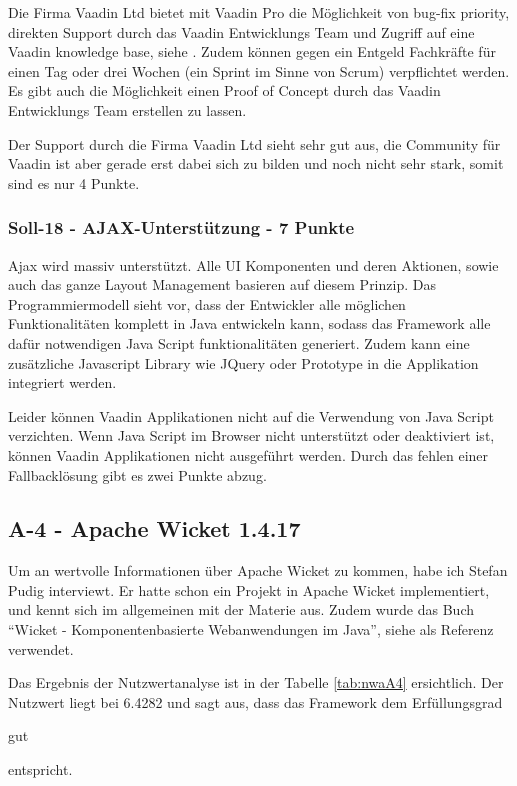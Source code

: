   Die Firma Vaadin Ltd bietet mit Vaadin Pro die Möglichkeit von bug-fix
  priority, direkten Support durch das Vaadin Entwicklungs Team und Zugriff auf
  eine Vaadin knowledge base, siehe \cite{VaadinPro}. Zudem können gegen ein
  Entgeld Fachkräfte für einen Tag oder drei Wochen (ein Sprint im Sinne von
  Scrum) verpflichtet werden. Es gibt auch die Möglichkeit einen Proof of
  Concept durch das Vaadin Entwicklungs Team erstellen zu lassen.
  
  Der Support durch die Firma Vaadin Ltd sieht sehr gut aus, die Community für
  Vaadin ist aber gerade erst dabei sich zu bilden und noch nicht sehr stark, somit
  sind es nur 4 Punkte.

  \subsubsection{Soll-18 - AJAX-Unterstützung - 7 Punkte}
  
  \ac{Ajax} wird massiv unterstützt. Alle \ac{UI} Komponenten und deren
  Aktionen, sowie auch das ganze Layout Management basieren auf diesem Prinzip.
  Das Programmiermodell sieht vor, dass der Entwickler alle möglichen
  Funktionalitäten komplett in Java entwickeln kann, sodass das Framework alle
  dafür notwendigen Java Script funktionalitäten generiert. Zudem kann eine
  zusätzliche Javascript Library wie JQuery oder Prototype in die Applikation
  integriert werden.
  
  Leider können Vaadin Applikationen nicht auf die Verwendung von Java
  Script verzichten. Wenn Java Script im Browser nicht unterstützt oder
  deaktiviert ist, können Vaadin Applikationen nicht ausgeführt werden. Durch
  das fehlen einer Fallbacklösung gibt es zwei Punkte abzug.
  
  \subsection{A-4 - Apache Wicket 1.4.17}
  
  Um an wertvolle Informationen über Apache Wicket zu kommen, habe ich Stefan
  Pudig interviewt. Er hatte schon ein Projekt in Apache Wicket implementiert,
  und kennt sich im allgemeinen mit der Materie aus. Zudem wurde das Buch
  ``Wicket - Komponentenbasierte Webanwendungen im Java'', siehe \cite{Wicket} als
  Referenz verwendet.
  
  Das Ergebnis der Nutzwertanalyse ist in der Tabelle \ref{tab:nwaA4}
  ersichtlich. Der Nutzwert liegt bei 6.4282 und sagt aus, dass das Framework
  dem Erfüllungsgrad \begin{itshape}gut\end{itshape} entspricht.
  \newline
  
